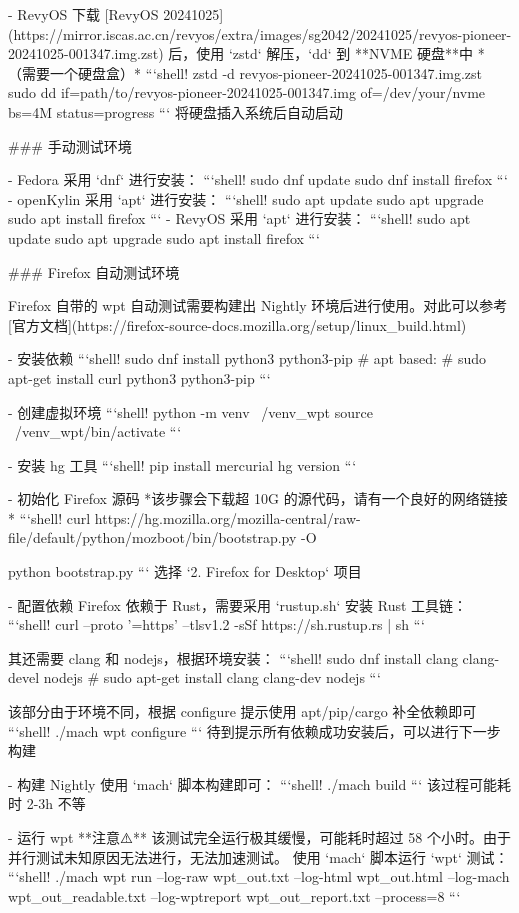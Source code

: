 \documentclass{article}
\begin{document}
\begin{markdown}
- RevyOS
下载 [RevyOS 20241025](https://mirror.iscas.ac.cn/revyos/extra/images/sg2042/20241025/revyos-pioneer-20241025-001347.img.zst) 后，使用 `zstd` 解压，`dd` 到 **NVME 硬盘**中 *（需要一个硬盘盒）*
```shell!
zstd -d revyos-pioneer-20241025-001347.img.zst
sudo dd if=path/to/revyos-pioneer-20241025-001347.img of=/dev/your/nvme bs=4M status=progress
```
将硬盘插入系统后自动启动

### 手动测试环境

- Fedora
采用 `dnf` 进行安装：
```shell!
sudo dnf update
sudo dnf install firefox
```
- openKylin
采用 `apt` 进行安装：
```shell!
sudo apt update
sudo apt upgrade
sudo apt install firefox
```
- RevyOS
采用 `apt` 进行安装：
```shell!
sudo apt update
sudo apt upgrade
sudo apt install firefox
```

### Firefox 自动测试环境

Firefox 自带的 wpt 自动测试需要构建出 Nightly 环境后进行使用。对此可以参考 [官方文档](https://firefox-source-docs.mozilla.org/setup/linux_build.html)

- 安装依赖
```shell!
sudo dnf install python3 python3-pip
# apt based:
# sudo apt-get install curl python3 python3-pip
```

- 创建虚拟环境
```shell!
python -m venv ~/venv_wpt
source ~/venv_wpt/bin/activate
```

- 安装 hg 工具
```shell!
pip install mercurial
hg version
```

- 初始化 Firefox 源码
*该步骤会下载超 10G 的源代码，请有一个良好的网络链接*
```shell!
curl https://hg.mozilla.org/mozilla-central/raw-file/default/python/mozboot/bin/bootstrap.py -O

python bootstrap.py
```
选择 `2. Firefox for Desktop` 项目

- 配置依赖
Firefox 依赖于 Rust，需要采用 `rustup.sh` 安装 Rust 工具链：
```shell!
curl --proto '=https' --tlsv1.2 -sSf https://sh.rustup.rs | sh
```

其还需要 clang 和 nodejs，根据环境安装：
```shell!
sudo dnf install clang clang-devel nodejs
# sudo apt-get install clang clang-dev nodejs
```

该部分由于环境不同，根据 configure 提示使用 apt/pip/cargo 补全依赖即可
```shell!
./mach wpt configure
```
待到提示所有依赖成功安装后，可以进行下一步构建

- 构建 Nightly
使用 `mach` 脚本构建即可：
```shell!
./mach build
```
该过程可能耗时 2-3h 不等

- 运行 wpt
**注意⚠️** 该测试完全运行极其缓慢，可能耗时超过 58 个小时。由于并行测试未知原因无法进行，无法加速测试。
使用 `mach` 脚本运行 `wpt` 测试：
```shell!
./mach wpt run --log-raw wpt_out.txt --log-html wpt_out.html --log-mach wpt_out_readable.txt --log-wptreport wpt_out_report.txt --process=8
```


\end{markdown}
\end{document}
